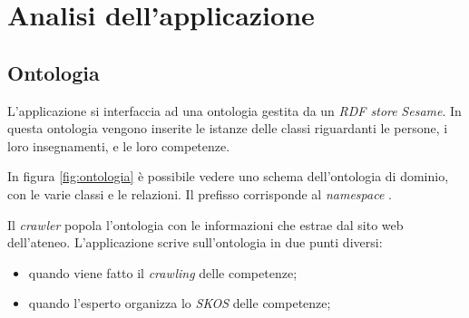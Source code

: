 \documentclass[tesi.tex]{subfiles}
\begin{document}
\chapter{Analisi dell'applicazione}

\section{Ontologia}\label{sec:ontologia}
L'applicazione si interfaccia ad una ontologia gestita da un \emph{RDF
  store} \emph{Sesame}. In questa ontologia vengono inserite le
istanze delle classi
riguardanti le persone, i loro insegnamenti, e le loro
competenze.

In figura \ref{fig:ontologia} \`e possibile vedere uno schema
dell'ontologia di dominio, con le varie classi e le relazioni.
Il prefisso  corrisponde al \emph{namespace}
.

Il \emph{crawler} popola l'ontologia con le informazioni che estrae
dal sito web dell'ateneo. L'applicazione scrive
sull'ontologia in due punti diversi:
\begin{itemize}
\item quando viene fatto il \emph{crawling} delle competenze;
\item quando l'esperto organizza lo \emph{SKOS} delle competenze;
\end{itemize}
\end{document}
